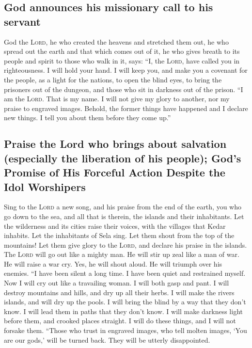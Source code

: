 \hypertarget{god-announces-his-missionary-call-to-his-servant}{%
\subsection{God announces his missionary call to his
servant}\label{god-announces-his-missionary-call-to-his-servant}}

 God the \textsc{Lord}, he who created the heavens and
stretched them out, he who spread out the earth and that which comes out
of it, he who gives breath to its people and spirit to those who walk in
it, says:  ``I, the \textsc{Lord}, have called you in
righteousness. I will hold your hand. I will keep you, and make you a
covenant for the people, as a light for the nations,  to
open the blind eyes, to bring the prisoners out of the dungeon, and
those who sit in darkness out of the prison.  ``I am the
\textsc{Lord}. That is my name. I will not give my glory to another, nor
my praise to engraved images.  Behold, the former things
have happened and I declare new things. I tell you about them before
they come up.''

\hypertarget{praise-the-lord-who-brings-about-salvation-especially-the-liberation-of-his-people-gods-promise-of-his-forceful-action-despite-the-idol-worshipers}{%
\subsection{Praise the Lord who brings about salvation (especially the
liberation of his people); God's Promise of His Forceful Action Despite
the Idol
Worshipers}\label{praise-the-lord-who-brings-about-salvation-especially-the-liberation-of-his-people-gods-promise-of-his-forceful-action-despite-the-idol-worshipers}}

 Sing to the \textsc{Lord} a new song, and his praise
from the end of the earth, you who go down to the sea, and all that is
therein, the islands and their inhabitants.  Let the
wilderness and its cities raise their voices, with the villages that
Kedar inhabits. Let the inhabitants of Sela sing. Let them shout from
the top of the mountains!  Let them give glory to the
\textsc{Lord}, and declare his praise in the islands. 
The \textsc{Lord} will go out like a mighty man. He will stir up zeal
like a man of war. He will raise a war cry. Yes, he will shout aloud. He
will triumph over his enemies.  ``I have been silent a
long time. I have been quiet and restrained myself. Now I will cry out
like a travailing woman. I will both gasp and pant.  I
will destroy mountains and hills, and dry up all their herbs. I will
make the rivers islands, and will dry up the pools.  I
will bring the blind by a way that they don't know. I will lead them in
paths that they don't know. I will make darkness light before them, and
crooked places straight. I will do these things, and I will not forsake
them.  ``Those who trust in engraved images, who tell
molten images, `You are our gods,' will be turned back. They will be
utterly disappointed.

